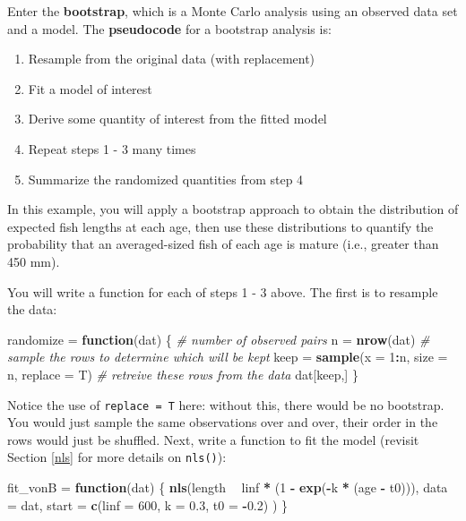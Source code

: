 \documentclass[]{book}
\newenvironment{Shaded}{\begin{snugshade}}{\end{snugshade}}
\newcommand{\KeywordTok}[1]{\textcolor[rgb]{0.13,0.29,0.53}{\textbf{#1}}}
\newcommand{\DataTypeTok}[1]{\textcolor[rgb]{0.13,0.29,0.53}{#1}}
\newcommand{\DecValTok}[1]{\textcolor[rgb]{0.00,0.00,0.81}{#1}}
\newcommand{\FloatTok}[1]{\textcolor[rgb]{0.00,0.00,0.81}{#1}}
\newcommand{\StringTok}[1]{\textcolor[rgb]{0.31,0.60,0.02}{#1}}
\newcommand{\CommentTok}[1]{\textcolor[rgb]{0.56,0.35,0.01}{\textit{#1}}}
\newcommand{\ControlFlowTok}[1]{\textcolor[rgb]{0.13,0.29,0.53}{\textbf{#1}}}
\newcommand{\OperatorTok}[1]{\textcolor[rgb]{0.81,0.36,0.00}{\textbf{#1}}}
\newcommand{\NormalTok}[1]{#1}
\providecommand{\tightlist}{%
  \setlength{\itemsep}{0pt}\setlength{\parskip}{0pt}}
\theoremstyle{definition}
\theoremstyle{definition}
\theoremstyle{definition}
\theoremstyle{remark}
\begin{document}
Enter the \textbf{bootstrap}, which is a Monte Carlo analysis using an
observed data set and a model. The \textbf{pseudocode} for a bootstrap
analysis is:

\begin{enumerate}
\def\labelenumi{\arabic{enumi}.}
\tightlist
\item
  Resample from the original data (with replacement)
\item
  Fit a model of interest
\item
  Derive some quantity of interest from the fitted model
\item
  Repeat steps 1 - 3 many times
\item
  Summarize the randomized quantities from step 4
\end{enumerate}

In this example, you will apply a bootstrap approach to obtain the
distribution of expected fish lengths at each age, then use these
distributions to quantify the probability that an averaged-sized fish of
each age is mature (i.e., greater than 450 mm).

You will write a function for each of steps 1 - 3 above. The first is to
resample the data:

\begin{Shaded}
\begin{Highlighting}[]
\NormalTok{randomize =}\StringTok{ }\ControlFlowTok{function}\NormalTok{(dat) \{}
  \CommentTok{# number of observed pairs}
\NormalTok{  n =}\StringTok{ }\KeywordTok{nrow}\NormalTok{(dat)}
  \CommentTok{# sample the rows to determine which will be kept}
\NormalTok{  keep =}\StringTok{ }\KeywordTok{sample}\NormalTok{(}\DataTypeTok{x =} \DecValTok{1}\OperatorTok{:}\NormalTok{n, }\DataTypeTok{size =}\NormalTok{ n, }\DataTypeTok{replace =}\NormalTok{ T)}
  \CommentTok{# retreive these rows from the data}
\NormalTok{  dat[keep,]}
\NormalTok{\}}
\end{Highlighting}
\end{Shaded}

Notice the use of \texttt{replace\ =\ T} here: without this, there would
be no bootstrap. You would just sample the same observations over and
over, their order in the rows would just be shuffled. Next, write a
function to fit the model (revisit Section \ref{nls} for more details on
\texttt{nls()}):

\begin{Shaded}
\begin{Highlighting}[]
\NormalTok{fit_vonB =}\StringTok{ }\ControlFlowTok{function}\NormalTok{(dat) \{}
  \KeywordTok{nls}\NormalTok{(length }\OperatorTok{~}\StringTok{ }\NormalTok{linf }\OperatorTok{*}\StringTok{ }\NormalTok{(}\DecValTok{1} \OperatorTok{-}\StringTok{ }\KeywordTok{exp}\NormalTok{(}\OperatorTok{-}\NormalTok{k }\OperatorTok{*}\StringTok{ }\NormalTok{(age }\OperatorTok{-}\StringTok{ }\NormalTok{t0))),}
      \DataTypeTok{data =}\NormalTok{ dat,}
      \DataTypeTok{start =} \KeywordTok{c}\NormalTok{(}\DataTypeTok{linf =} \DecValTok{600}\NormalTok{, }\DataTypeTok{k =} \FloatTok{0.3}\NormalTok{, }\DataTypeTok{t0 =} \OperatorTok{-}\FloatTok{0.2}\NormalTok{)}
\NormalTok{      )}
\NormalTok{\}}
\end{Highlighting}
\end{Shaded}
\end{document}
